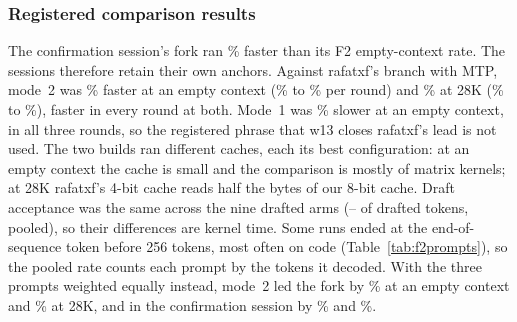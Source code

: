 \documentclass[11pt,letterpaper]{article}
\begin{document}
\subsubsection{Registered comparison results}
The confirmation session's fork ran \PeCfRafVsFtPct\% faster than its F2
empty-context rate. The sessions therefore retain their own anchors.
Against rafatxf's branch with MTP, mode~2 was \PeFtOverRafZeroPct\% faster at
an empty context (\PeFtOverRafZeroLo\% to \PeFtOverRafZeroHi\% per round) and
\PeFtOverRafTwentyEightPct\% at 28K (\PeFtOverRafTwentyEightLo\% to
\PeFtOverRafTwentyEightHi\%), faster in every round at both. Mode~1 was
\PeFtSOneOverRafZeroPct\% slower at an empty context, in all three rounds, so
the registered phrase that w13 closes rafatxf's lead is not used. The two
builds ran different caches, each its best configuration: at an empty context
the cache is small and the comparison is mostly of matrix kernels; at 28K
rafatxf's 4-bit cache reads half the bytes of our 8-bit cache. Draft
acceptance was the same across the nine drafted arms (\PeFtAcceptLo--\PeFtAcceptHi{}
of drafted tokens, pooled), so their differences are kernel time. Some runs
ended at the end-of-sequence token before 256 tokens, most often on code
(Table~\ref{tab:f2prompts}), so the pooled rate counts each prompt by the
tokens it decoded. With the three prompts weighted equally instead, mode~2
led the fork by \PeFtOverRafZeroEqPct\% at an empty context and
\PeFtOverRafTwentyEightEqPct\% at 28K, and in the confirmation session by
\PeCfPRafZeroEq\% and \PeCfPRafDeepEq\%.
\end{document}
